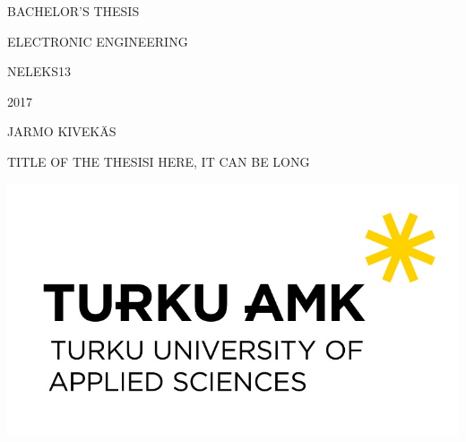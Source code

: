 
\begin{titlepage}
    BACHELOR'S THESIS

    ELECTRONIC ENGINEERING

    NELEKS13

    2017

    {
        \addtolength{\leftskip}{0.886in}
    	\vspace{5cm}
        JARMO KIVEKÄS\par
    	{\Huge TITLE OF THE THESISI HERE, IT CAN BE LONG\par}
    }
    \vfill
    {
        \centering
    	\includegraphics{img/tuas-logo}\par\vspace{1cm}
    }
\end{titlepage}
